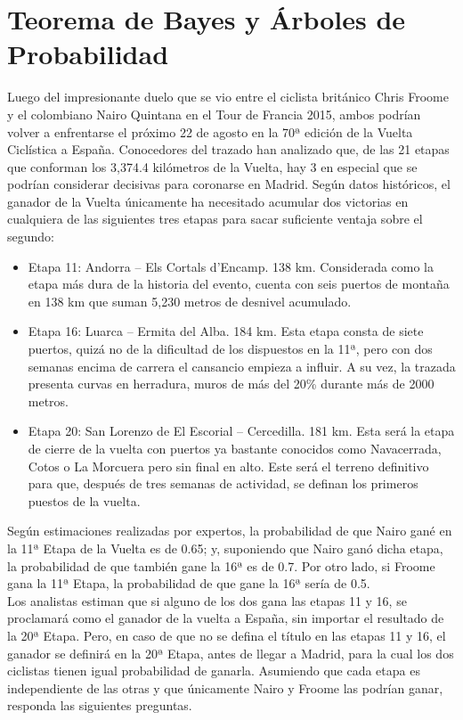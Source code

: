\documentclass[11pt, spanish]{article}
\begin{document}
\section{Teorema de Bayes y Árboles de Probabilidad}

Luego del impresionante duelo que se vio entre el ciclista británico Chris Froome y el colombiano
Nairo Quintana en el Tour de Francia 2015, ambos podrían volver a enfrentarse el próximo 22 de
agosto en la 70ª edición de la Vuelta Ciclística a España. Conocedores del trazado han analizado
que, de las 21 etapas que conforman los 3,374.4 kilómetros de la Vuelta, hay 3 en especial que se podrían considerar decisivas para coronarse en Madrid. Según datos históricos, el ganador de la Vuelta únicamente ha necesitado acumular dos victorias en cualquiera de las siguientes tres etapas para sacar suficiente ventaja sobre el segundo:

\begin{itemize}
\item Etapa 11: Andorra – Els Cortals d’Encamp. 138 km. Considerada como la etapa más dura de la historia del evento, cuenta con seis puertos de montaña en 138 km que suman 5,230 metros de desnivel acumulado.
\item Etapa 16: Luarca – Ermita del Alba. 184 km. Esta etapa consta de siete puertos, quizá no de la dificultad de los dispuestos en la 11ª, pero con dos semanas encima de carrera el cansancio empieza a influir. A su vez, la trazada presenta curvas en herradura, muros de más del 20\% durante más de 2000 metros.
\item Etapa 20: San Lorenzo de El Escorial – Cercedilla. 181 km. Esta será la etapa de cierre de la vuelta con puertos ya bastante conocidos como Navacerrada, Cotos o La Morcuera pero sin final en alto. Este será el terreno definitivo para que, después de tres semanas de actividad, se definan los primeros puestos de la vuelta.
\end{itemize}

Según estimaciones realizadas por expertos, la probabilidad de que Nairo gané en la 11ª Etapa de
la Vuelta es de 0.65; y, suponiendo que Nairo ganó dicha etapa, la probabilidad de que también gane
la 16ª es de 0.7. Por otro lado, si Froome gana la 11ª Etapa, la probabilidad de que gane la 16ª sería
de 0.5.\\

Los analistas estiman que si alguno de los dos gana las etapas 11 y 16, se proclamará como el
ganador de la vuelta a España, sin importar el resultado de la 20ª Etapa. Pero, en caso de que no
se defina el título en las etapas 11 y 16, el ganador se definirá en la 20ª Etapa, antes de llegar a
Madrid, para la cual los dos ciclistas tienen igual probabilidad de ganarla. Asumiendo que cada etapa es independiente de las otras y que únicamente Nairo y Froome las podrían ganar, responda las siguientes preguntas.
\end{document}

